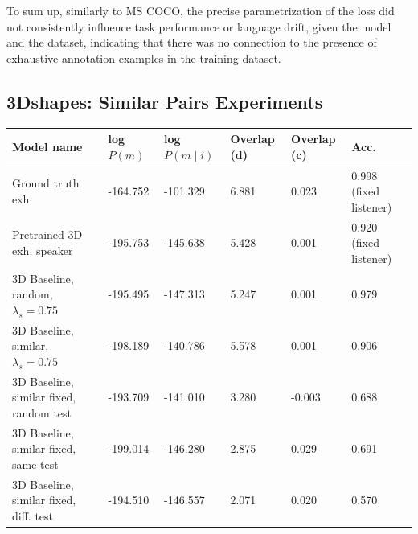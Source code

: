 To sum up, similarly to MS COCO, the precise parametrization of the loss did not consistently influence task performance or language drift, given the model and the dataset, indicating that there was no connection to the presence of exhaustive annotation examples in the training dataset.

\subsection{3Dshapes: Similar Pairs Experiments}
\label{expt:3dsapes_similar}

\begin{table}[]
	\begin{tabularx}{\textwidth}{|X|l|l|X|X|X|}
		\hline
		\textbf{Model name}                                    & \textbf{log $P(m)$} & \textbf{log $P(m \mid i)$} & \textbf{Overlap (d)} & \textbf{Overlap (c)} & \textbf{Acc.} \\ \hline
		Ground truth exh.       &      -164.752            &         -101.329               &       6.881             &      0.023               &       0.998 (fixed listener)       \\ \hline
		Pretrained 3D exh. speaker                            &       -195.753            &         -145.638               &        5.428              &      0.001                & 0.920 (fixed listener)         \\ \hline
		3D Baseline, random, $\lambda_s = 0.75$  &       -195.495        &           -147.313           &          5.247            &         0.001             & 0.979               \\ \hline
		3D Baseline, similar, $\lambda_s = 0.75$ &      -198.189             &       -140.786                 &           5.578           &        0.001              &         0.906                        \\ \hline
		3D Baseline, similar fixed, random test &       -193.709            &    -141.010                  &        3.280            &      -0.003         &            0.688           \\ \hline
		3D Baseline, similar fixed, same test &      -199.014        &        -146.280           &        2.875       &      0.029   &     0.691                   \\ \hline
		3D Baseline, similar fixed, diff. test &     -194.510     &    -146.557          &   2.071      & 0.020    &     0.570          \\ \hline

\end{tabularx}
\end{table}
